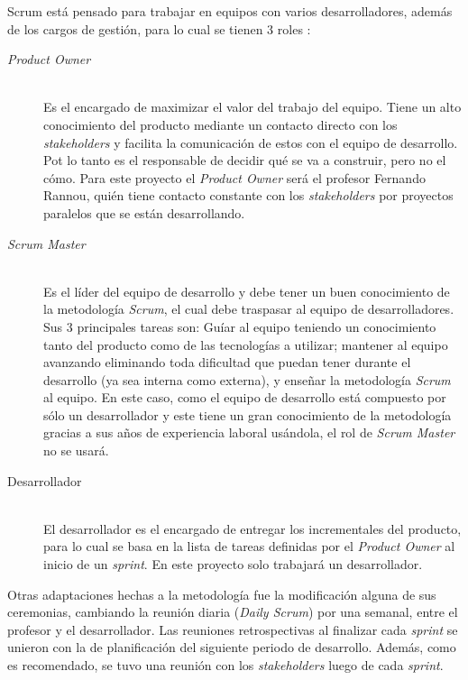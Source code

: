 Scrum está pensado para trabajar en equipos con varios desarrolladores, además de los cargos de gestión, para lo cual se tienen 3 roles \citep{website:ScrumRoles}:

\begin{description}
  \item[\emph{Product Owner}] \hfill \\
  Es el encargado de maximizar el valor del trabajo del equipo. Tiene un alto conocimiento del producto mediante un contacto directo con los \emph{stakeholders} y facilita la comunicación de estos con el equipo de desarrollo. Pot lo tanto es el responsable de decidir qué se va a construir, pero no el cómo. Para este proyecto el \emph{Product Owner} será el profesor Fernando Rannou, quién tiene contacto constante con los \emph{stakeholders} por proyectos paralelos que se están desarrollando.
  \item[\emph{Scrum Master}] \hfill \\
  Es el líder del equipo de desarrollo y debe tener un buen conocimiento de la metodología \emph{Scrum}, el cual debe traspasar al equipo de desarrolladores. Sus 3 principales tareas son: Guíar al equipo teniendo un conocimiento tanto del producto como de las tecnologías a utilizar; mantener al equipo avanzando eliminando toda dificultad que puedan tener durante el desarrollo (ya sea interna como externa), y enseñar la metodología \emph{Scrum} al equipo. En este caso, como el equipo de desarrollo está compuesto por sólo un desarrollador y este tiene un gran conocimiento de la metodología gracias a sus años de experiencia laboral usándola, el rol de \emph{Scrum Master} no se usará.
  \item[Desarrollador] \hfill \\
  El desarrollador es el encargado de entregar los incrementales del producto, para lo cual se basa en la lista de tareas definidas por el \emph{Product Owner} al inicio de un \emph{sprint}. En este proyecto solo trabajará un desarrollador.
\end{description}

Otras adaptaciones hechas a la metodología fue la modificación alguna de sus ceremonias, cambiando la reunión diaria (\emph{Daily Scrum}) por una semanal, entre el profesor y el desarrollador. Las reuniones retrospectivas al finalizar cada \emph{sprint} se unieron con la de planificación del siguiente periodo de desarrollo. Además, como es recomendado, se tuvo una reunión con los \emph{stakeholders} luego de cada \emph{sprint}.

